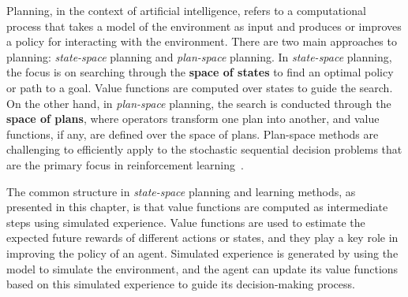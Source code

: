\documentclass[../xlapes02]{subfiles}
\begin{document}
    Planning, in the context of artificial intelligence, refers to a computational process that takes a model of the environment as input and produces or improves a policy for interacting with the environment.
    There are two main approaches to planning: \emph{state-space} planning and \emph{plan-space} planning.
    In \emph{state-space} planning, the focus is on searching through the \textbf{space of states} to find an optimal policy or path to a goal.
    Value functions are computed over states to guide the search.
    On the other hand, in \emph{plan-space} planning, the search is conducted through the \textbf{space of plans}, where operators transform one plan into another, and value functions, if any, are defined over the space of plans.
    Plan-space methods are challenging to efficiently apply to the stochastic sequential decision problems that are the primary focus in reinforcement learning~\cite{sutton2018reinforcement}.

    The common structure in \emph{state-space} planning and learning methods, as presented in this chapter, is that value functions are computed as intermediate steps using simulated experience.
    Value functions are used to estimate the expected future rewards of different actions or states, and they play a key role in improving the policy of an agent.
    Simulated experience is generated by using the model to simulate the environment, and the agent can update its value functions based on this simulated experience to guide its decision-making process.
%
    \begin{center}
    \end{center}
\end{document}
